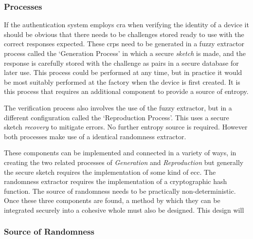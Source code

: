 \subsubsection{Processes}

If the authentication system employs \gls{cra} when verifying the identity
of a device it should be obvious that there needs to be challenges stored ready
to use with the correct responses expected. These \glspl{crp} need
to be generated in a fuzzy extractor process called the `Generation Process' in
which a secure \emph{sketch} is made, and the response is carefully stored with the
challenge as pairs in a secure database for later use.
This process could be performed at any time, but in practice it would be most
suitably performed at the factory when the device is first created. It is this
process that requires an additional component to provide a source of entropy.

The verification process also involves the use of the fuzzy extractor, but in a
different configuration called the `Reproduction Process'. This uses a
secure sketch \emph{recovery} to mitigate errors. No further entropy source is
required. However both processes make use of a identical randomness extractor.

These components can be implemented and connected in a variety of ways, in
creating the two related processes of \emph{Generation} and \emph{Reproduction} but
generally the secure sketch requires the implementation of some kind of
\gls{ecc}.
The randomness extractor requires the implementation of a cryptographic hash
function. The source of randomness needs to be practically non-deterministic.
Once these three components are found, a method by which they can be integrated
securely into a cohesive whole must also be designed. This design will

\subsubsection{Source of Randomness}

